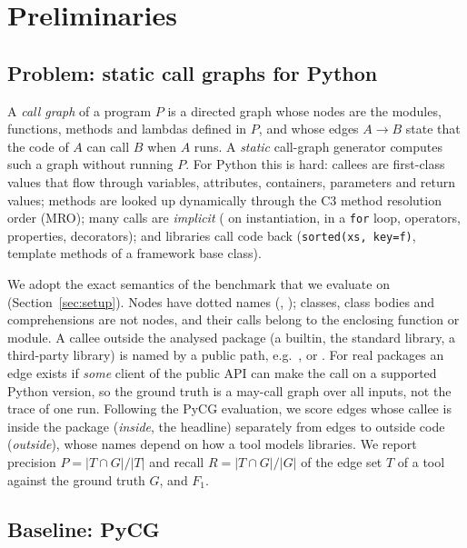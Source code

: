 \section{Preliminaries}
\label{sec:prelim}

\subsection{Problem: static call graphs for Python}

A \emph{call graph} of a program $P$ is a directed graph whose nodes are the
modules, functions, methods and lambdas defined in $P$, and whose edges
$A \rightarrow B$ state that the code of $A$ can call $B$ when $A$ runs. A
\emph{static} call-graph generator computes such a graph without running $P$.
For Python this is hard: callees are first-class values that flow through
variables, attributes, containers, parameters and return values; methods are
looked up dynamically through the C3 method resolution order (MRO); many calls
are \emph{implicit} ( on instantiation, 
in a \texttt{for} loop, operators, properties, decorators); and libraries call
code back (\texttt{sorted(xs, key=f)}, template methods of a framework base
class).

We adopt the exact semantics of the benchmark that we evaluate on
(Section~\ref{sec:setup}). Nodes have dotted names (,
); classes, class bodies and comprehensions are not
nodes, and their calls belong to the enclosing function or module. A callee
outside the analysed package (a builtin, the standard library, a third-party
library) is named by a public path, e.g.\ ,
 or . For real packages an edge
exists if \emph{some} client of the public API can make the call on a supported
Python version, so the ground truth is a may-call graph over all inputs, not
the trace of one run. Following the PyCG evaluation, we score edges whose
callee is inside the package (\emph{inside}, the headline) separately from
edges to outside code (\emph{outside}), whose names depend on how a tool models
libraries. We report precision $P = |T \cap G| / |T|$ and recall
$R = |T \cap G| / |G|$ of the edge set $T$ of a tool against the ground truth
$G$, and $F_1$.

\subsection{Baseline: PyCG}

